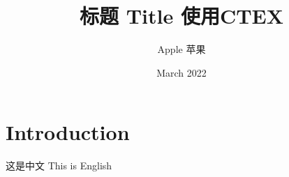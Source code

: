 \documentclass{article}
\title{标题 Title 使用CTEX}
\author{Apple 苹果}
\date{March 2022}
\begin{document}
\maketitle

\section{Introduction}
这是中文 This is English
\end{document}
